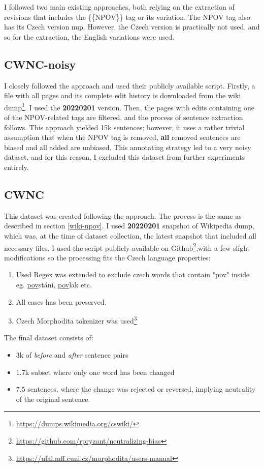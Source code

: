 I followed two main existing approaches, both relying on the extraction of revisions that includes the \{\{NPOV\}\} tag or its variation. The NPOV tag also has its Czech version \Gls{nup}. However, the Czech version is practically not used, and so for the extraction, the English variations were used.





\subsection{CWNC-noisy}
I closely followed the \cite{aleksandrova2019multilingual} approach and used their publicly available script. Firstly, a file with all pages and its complete edit history is downloaded from the wiki dump\footnote{\url{https://dumps.wikimedia.org/cswiki/}}. I used the \textbf{20220201} version. Then, the pages with edits containing one of the NPOV-related tags are filtered, and the process of sentence extraction follows.
This approach yielded 15k sentences; however, it uses a rather trivial assumption that when the NPOV tag is removed, \textbf{all} removed sentences are biased and all added are unbiased. This annotating strategy led to a very noisy dataset, and for this reason, I excluded this dataset from further experiments entirely.


\subsection{CWNC}\label{wncs}
This dataset was created following the \cite{pryzant2020automatically} approach. The process is the same as described in section \ref{wiki-npov}. I used \textbf{20220201} snapshot of Wikipedia dump, which was, at the time of dataset collection, the latest snapshot that included all necessary files.
I used the script publicly available on Github\footnote{\url{https://github.com/rpryzant/neutralizing-bias}},with a few slight modifications so the processing fits the Czech language properties:
\begin{enumerate}
    \item Used Regex was extended to exclude czech words that contain "pov" inside eg. \underline{pov}stání, \underline{pov}lak etc.
    \item All cases has been preserved.
    \item Czech Morphodita tokenizer was used\footnote{\url{https://ufal.mff.cuni.cz/morphodita/users-manual}}
\end{enumerate}
The final dataset consists of:
\begin{itemize}
    \item 3k of \textit{before} and \textit{after} sentence pairs
    \item 1.7k subset where only one word has been changed
    \item 7.5 sentences, where the change was rejected or reversed, implying neutrality of the original sentence.
\end{itemize}

